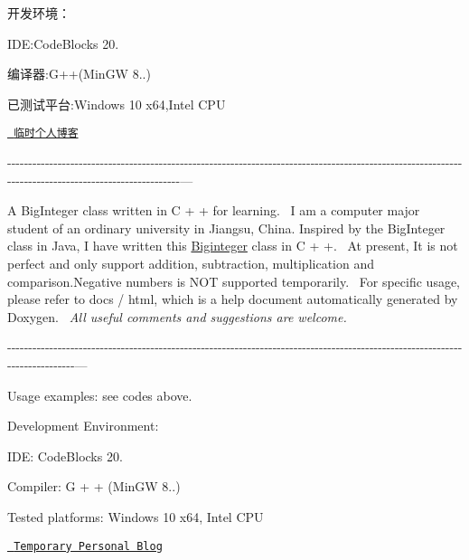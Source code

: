 开发环境：

IDE\+:Code\+Blocks 20. 

编译器\+:G++(Min\+GW 8..) 

已测试平台\+:Windows 10 x64,Intel CPU

\href{https://blog.csdn.net/m0_51303687?spm=1011.2124.3001.5343}{\texttt{ 临时个人博客}}

-\/-\/-\/-\/-\/-\/-\/-\/-\/-\/-\/-\/-\/-\/-\/-\/-\/-\/-\/-\/-\/-\/-\/-\/-\/-\/-\/-\/-\/-\/-\/-\/-\/-\/-\/-\/-\/-\/-\/-\/-\/-\/-\/-\/-\/-\/-\/-\/-\/-\/-\/-\/-\/-\/-\/-\/-\/-\/-\/-\/-\/-\/-\/-\/-\/-\/-\/-\/-\/-\/-\/-\/-\/-\/-\/-\/-\/-\/-\/-\/-\/-\/-\/-\/-\/-\/-\/-\/-\/-\/-\/-\/-\/-\/-\/-\/-\/-\/-\/-\/-\/-\/-\/-\/-\/-\/-\/-\/-\/-\/-\/-\/-\/-\/-\/-\/-\/-\/-\/-\/-\/-\/-\/-\/-\/-\/-\/-\/-\/-\/-\/-\/-\/-\/-\/-\/-\/-\/-\/-\/-\/-\/-\/-\/-\/-\/-\/-\/-\/---

A Big\+Integer class written in C + + for learning.~\newline
 I am a computer major student of an ordinary university in Jiangsu, China. Inspired by the Big\+Integer class in Java, I have written this \mbox{\hyperlink{class_biginteger}{Biginteger}} class in C + +.~\newline
 At present, It is not perfect and only support addition, subtraction, multiplication and comparison.\+Negative numbers is NOT supported temporarily.~\newline
 For specific usage, please refer to docs / html, which is a help document automatically generated by Doxygen.~\newline
 {\itshape All useful comments and suggestions are welcome.} 

-\/-\/-\/-\/-\/-\/-\/-\/-\/-\/-\/-\/-\/-\/-\/-\/-\/-\/-\/-\/-\/-\/-\/-\/-\/-\/-\/-\/-\/-\/-\/-\/-\/-\/-\/-\/-\/-\/-\/-\/-\/-\/-\/-\/-\/-\/-\/-\/-\/-\/-\/-\/-\/-\/-\/-\/-\/-\/-\/-\/-\/-\/-\/-\/-\/-\/-\/-\/-\/-\/-\/-\/-\/-\/-\/-\/-\/-\/-\/-\/-\/-\/-\/-\/-\/-\/-\/-\/-\/-\/-\/-\/-\/-\/-\/-\/-\/-\/-\/-\/-\/-\/-\/-\/-\/-\/-\/-\/-\/-\/-\/-\/-\/-\/-\/-\/-\/-\/-\/-\/-\/-\/-\/-\/---

Usage examples\+: see codes above.

Development Environment\+:

IDE\+: Code\+Blocks 20. 

Compiler\+: G + + (Min\+GW 8..)

Tested platforms\+: Windows 10 x64, Intel CPU

\href{https://blog.csdn.net/m0_51303687?spm=1011.2124.3001.5343}{\texttt{ Temporary Personal Blog}}